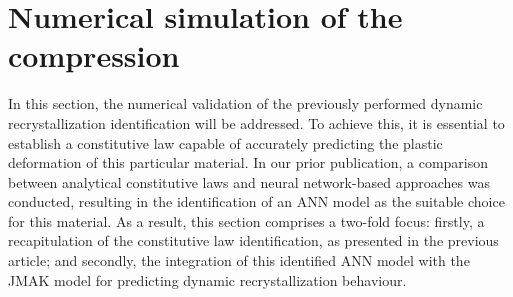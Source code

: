\documentclass[metals,article,submit,pdftex,moreauthors]{Definitions/mdpi}
\begin{document}
\section{Numerical simulation of the compression\label{sec:NumSim}}
In this section, the numerical validation of the previously performed dynamic recrystallization identification will be addressed. To achieve this, it is essential to establish a constitutive law capable of accurately predicting the plastic deformation of this particular material. In our prior publication, a comparison between analytical constitutive laws and neural network-based approaches was conducted, resulting in the identification of an ANN model as the suitable choice for this material. As a result, this section comprises a two-fold focus: firstly, a recapitulation of the constitutive law identification, as presented in the previous article; and secondly, the integration of this identified ANN model with the JMAK model for predicting dynamic recrystallization behaviour.
\end{document}
